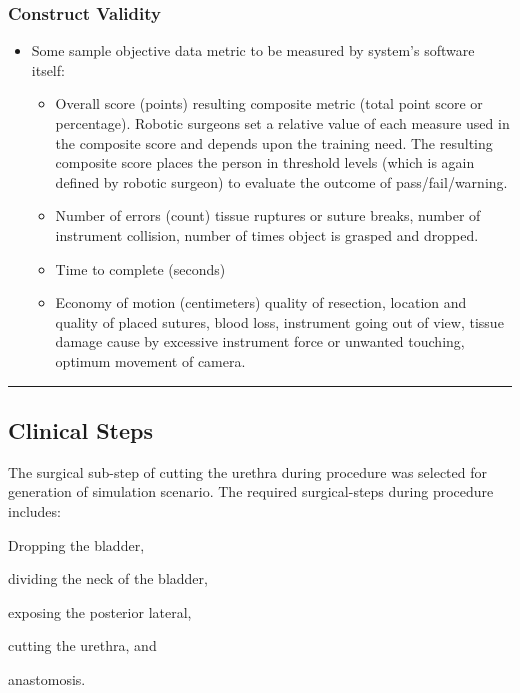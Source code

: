 \subsubsection{Construct Validity}\label{sssec:construct_validity}
\begin{itemize}
  \item Some sample objective data metric to be measured by system's software itself:
  \begin{itemize}
    \item Overall score (points) \eg resulting composite metric (total point score or percentage). Robotic surgeons set a relative value of each measure used in the composite score and depends upon the training need. The resulting composite score places the person in threshold levels (which is again defined by robotic surgeon) to evaluate the outcome of pass/fail/warning.
    \item Number of errors (count) \eg tissue ruptures or suture breaks, number of instrument collision, number of times object is grasped and dropped.
    \item Time to complete (seconds)
    \item Economy of motion (centimeters) \eg quality of resection, location and quality of placed sutures, blood loss, instrument going out of view, tissue damage cause by excessive instrument force or unwanted touching, optimum movement of camera.
  \end{itemize}
\end{itemize}




\hrule%

\subsection{Clinical Steps}\label{ssec:clinical}
The surgical sub-step of cutting the urethra during  procedure was selected for generation of simulation scenario. The required surgical-steps during  procedure includes:
\begin{enumerate*}[\em i\em)]
  \item Dropping the bladder,
  \item dividing the neck of the bladder,
  \item exposing the posterior lateral,
  \item cutting the urethra, and
  \item anastomosis.
\end{enumerate*}

